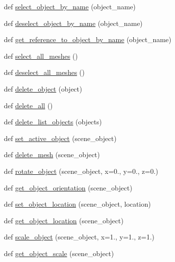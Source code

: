 \begin{DoxyCompactItemize}
\item 
def \hyperlink{namespacescene__ops_a7ba32d49164d4336da0452c63059aa14}{select\+\_\+object\+\_\+by\+\_\+name} (object\+\_\+name)
\item 
def \hyperlink{namespacescene__ops_a710ecca9a634a08382408e06b5507322}{deselect\+\_\+object\+\_\+by\+\_\+name} (object\+\_\+name)
\item 
def \hyperlink{namespacescene__ops_a970804ab6de8c587a49525faea234506}{get\+\_\+reference\+\_\+to\+\_\+object\+\_\+by\+\_\+name} (object\+\_\+name)
\item 
def \hyperlink{namespacescene__ops_ab0098f2691dc3af45dc898860af97a70}{select\+\_\+all\+\_\+meshes} ()
\item 
def \hyperlink{namespacescene__ops_a90e772a42f49843e480fd4fd5eaa29b0}{deselect\+\_\+all\+\_\+meshes} ()
\item 
def \hyperlink{namespacescene__ops_afbe15a564659a67ab9575157a20d58d4}{delete\+\_\+object} (object)
\item 
def \hyperlink{namespacescene__ops_acb7621ef5c8d79c83d053b410c808953}{delete\+\_\+all} ()
\item 
def \hyperlink{namespacescene__ops_a4f0d45214a50f65d2c9202caa5de411a}{delete\+\_\+list\+\_\+objects} (objects)
\item 
def \hyperlink{namespacescene__ops_a53f493fde29403e00514a3deb8cb216e}{set\+\_\+active\+\_\+object} (scene\+\_\+object)
\item 
def \hyperlink{namespacescene__ops_a5493abf4f01f5141bed3257aac8b08a1}{delete\+\_\+mesh} (scene\+\_\+object)
\item 
def \hyperlink{namespacescene__ops_a08102db94e71ce0814c411e294dbd380}{rotate\+\_\+object} (scene\+\_\+object, x=0., y=0., z=0.)
\item 
def \hyperlink{namespacescene__ops_a02d39794ce04e513f6de10b779e881f7}{get\+\_\+object\+\_\+orientation} (scene\+\_\+object)
\item 
def \hyperlink{namespacescene__ops_ab03901f824579a2458315d2c9de786a9}{set\+\_\+object\+\_\+location} (scene\+\_\+object, location)
\item 
def \hyperlink{namespacescene__ops_a78d8828f8fddc2cd7ee31fdc9b6c890f}{get\+\_\+object\+\_\+location} (scene\+\_\+object)
\item 
def \hyperlink{namespacescene__ops_a120c9e1a0d91a38f63bf48f1fde33fb1}{scale\+\_\+object} (scene\+\_\+object, x=1., y=1., z=1.)
\item 
def \hyperlink{namespacescene__ops_a46659e7a61d5278678bd6fef3265f406}{get\+\_\+object\+\_\+scale} (scene\+\_\+object)

\end{DoxyCompactItemize}

